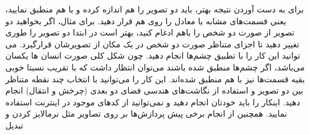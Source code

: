 \documentclass[a4paper]{article}
\begin{document}
برای به دست آوردن نتیجه بهتر، باید دو تصویر را هم اندازه کرده و با هم منطبق نمایید، یعنی قسمت‌های مشابه یا معادل را روی هم قرار دهید. برای مثال، اگر بخواهید دو تصویر از صورت دو شخص را باهم ادغام کنید، بهتر است در ابتدا دو تصویر را طوری تغییر دهید تا اجزای متناظر صورت دو شخص در یک مکان از تصویرشان قرارگیرد. می توانید این کار را با تطبیق چشم‌ها انجام دهید. چون شکل کلی صورت انسان ها یکسان می‌باشد، اگر چشم‌ها منطبق شده باشند می‌توان انتظار داشت که با تقریب نسبتا خوبی بقیه قسمت‌ها نیز با هم منطبق شده‌اند. این کار را می‌توانید با انتخاب چند نقطه متناظر بین دو تصویر و استفاده از نگاشت‌های هندسی فضای دو بعدی (چرخش و انتقال) انجام دهید. اینکار را باید خودتان انجام دهید و نمی‌توانید از کدهای موجود در اینترنت استفاده نمایید. همچنین از انجام برخی پیش پردازش‌ها بر روی تصاویر مثل نرمالایز کردن و تبدیل
\end{document}
